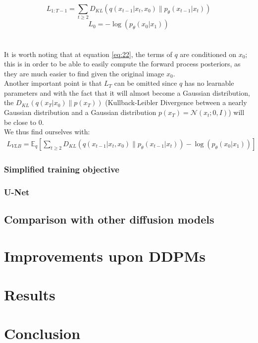\documentclass{article}
\begin{document}
$$ L_{1:T-1} = \sum_{t \geq 2} D_{KL}(q(x_{t-1} | x_t, x_0) \| p_{\theta}(x_{t-1} | x_t))$$
$$ L_0 =  - \log(p_{\theta}(x_0 | x_1))$$
\\\\
It is worth noting that at equation \ref{eq:22}, the terms of $q$ are conditioned on $x_0$; this is in order to be able to easily compute the forward process posteriors, as they are much easier to find given the original image $x_0$. \\
Another important point is that $L_T$ can be omitted since $q$ has no learnable parameters and with the fact that it will almost become a Gaussian distribution, the $D_{KL}(q(x_T | x_0) \| p(x_T))$ (Kullback-Leibler Divergence between a nearly Gaussian distribution and a Gaussian distribution $p(x_T) = \mathcal{N}(x_t; 0, I)$) will be close to 0. \cite{ho2020denoising} \\
We thus find ourselves with:
\begin{gather}
  L_{VLB} = \mathbb{E}_q[ \sum_{t \geq 2} D_{KL}(q(x_{t-1} | x_t, x_0) \| p_{\theta}(x_{t-1} | x_t)) - \log(p_{\theta}(x_0 | x_1)) ] \label{eq:28}
\end{gather}





\subsubsection{Simplified training objective}

\subsubsection{U-Net}


\subsection{Comparison with other diffusion models}

\newpage
\section{Improvements upon DDPMs}

\newpage
\section{Results}

\newpage
\section{Conclusion}


\newpage
\printbibliography
\end{document}
